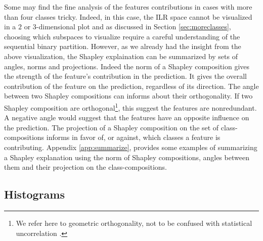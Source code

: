 \documentclass{article}
\theoremstyle{plain}
\theoremstyle{definition}
\theoremstyle{remark}
\begin{document}
Some may find the fine analysis of the features contributions in cases with more than four classes tricky. Indeed, in this case, the ILR space cannot be visualized in a $2$ or $3$-dimensional plot and as discussed in Section \ref{sec:moreclasses}, choosing which subspaces to visualize require a careful understanding of the sequential binary partition. However, as we already had the insight from the above visualization, the Shapley explaination can be summarized by sets of angles, norms and projections. Indeed the norm of a Shapley composition gives the strength of the feature's contribution in the prediction. It gives the overall contribution of the feature on the prediction, regardless of its direction. The angle between two Shapley compositions can informs about their orthogonality. If two Shapley composition are orthogonal\footnote{We refer here to geometric orthogonality, not to be confused with statistical uncorrelation \cite{pawlowskymodeling}.}, this suggest the features are nonredundant. A negative angle would suggest that the features have an opposite influence on the prediction. The projection of a Shapley composition on the set of class-compositions informs in favor of, or against, which classes a feature is contributing. Appendix \ref{app:summarize}, provides some examples of summarizing a Shapley explanation using the norm of Shapley compositions, angles between them and their projection on the class-compositions.

\subsection{Histograms}
\end{document}
